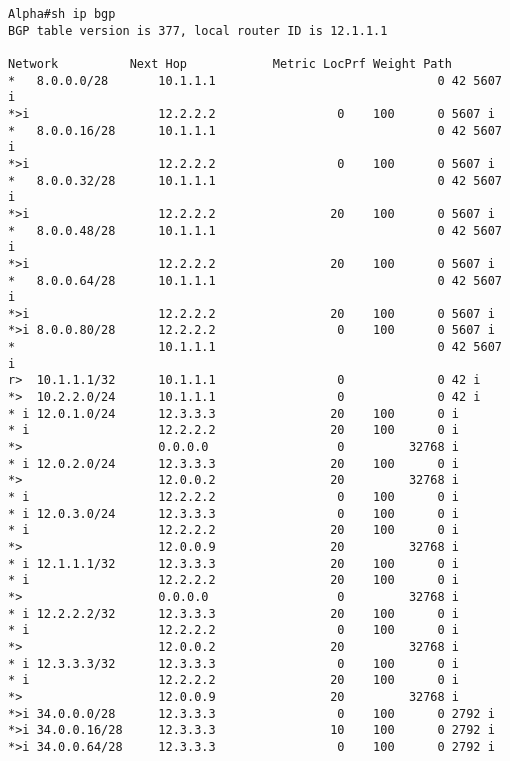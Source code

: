 \begin{lstlisting}[caption={Extract of Alpha BGP Table}, label={listing:bgp-table}]
Alpha#sh ip bgp
BGP table version is 377, local router ID is 12.1.1.1

Network          Next Hop            Metric LocPrf Weight Path
*   8.0.0.0/28       10.1.1.1                               0 42 5607 i
*>i                  12.2.2.2                 0    100      0 5607 i
*   8.0.0.16/28      10.1.1.1                               0 42 5607 i
*>i                  12.2.2.2                 0    100      0 5607 i
*   8.0.0.32/28      10.1.1.1                               0 42 5607 i
*>i                  12.2.2.2                20    100      0 5607 i
*   8.0.0.48/28      10.1.1.1                               0 42 5607 i
*>i                  12.2.2.2                20    100      0 5607 i
*   8.0.0.64/28      10.1.1.1                               0 42 5607 i
*>i                  12.2.2.2                20    100      0 5607 i
*>i 8.0.0.80/28      12.2.2.2                 0    100      0 5607 i
*                    10.1.1.1                               0 42 5607 i
r>  10.1.1.1/32      10.1.1.1                 0             0 42 i
*>  10.2.2.0/24      10.1.1.1                 0             0 42 i
* i 12.0.1.0/24      12.3.3.3                20    100      0 i
* i                  12.2.2.2                20    100      0 i
*>                   0.0.0.0                  0         32768 i
* i 12.0.2.0/24      12.3.3.3                20    100      0 i
*>                   12.0.0.2                20         32768 i
* i                  12.2.2.2                 0    100      0 i
* i 12.0.3.0/24      12.3.3.3                 0    100      0 i
* i                  12.2.2.2                20    100      0 i
*>                   12.0.0.9                20         32768 i
* i 12.1.1.1/32      12.3.3.3                20    100      0 i
* i                  12.2.2.2                20    100      0 i
*>                   0.0.0.0                  0         32768 i
* i 12.2.2.2/32      12.3.3.3                20    100      0 i
* i                  12.2.2.2                 0    100      0 i
*>                   12.0.0.2                20         32768 i
* i 12.3.3.3/32      12.3.3.3                 0    100      0 i
* i                  12.2.2.2                20    100      0 i
*>                   12.0.0.9                20         32768 i
*>i 34.0.0.0/28      12.3.3.3                 0    100      0 2792 i
*>i 34.0.0.16/28     12.3.3.3                10    100      0 2792 i
*>i 34.0.0.64/28     12.3.3.3                 0    100      0 2792 i

\end{lstlisting}
